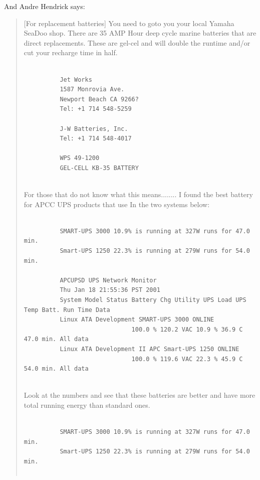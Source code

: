 And Andre Hendrick says:  

\begin{quote}

[For replacement batteries] You need to goto you your local Yamaha SeaDoo
shop. There are 35 AMP Hour deep cycle marine batteries that are direct
replacements. These are gel-cel and will double the runtime and/or cut your
recharge time in half.  

\footnotesize
\begin{verbatim}
          
          Jet Works
          1587 Monrovia Ave.
          Newport Beach CA 9266?
          Tel: +1 714 548-5259
          
          J-W Batteries, Inc.
          Tel: +1 714 548-4017
          
          WPS 49-1200
          GEL-CELL KB-35 BATTERY
     
\end{verbatim}
\normalsize

For those that do not know what this means........ I found the best battery
for APCC UPS products that use In the two systems below:  

\footnotesize
\begin{verbatim}
          
          SMART-UPS 3000 10.9% is running at 327W runs for 47.0 min.
          Smart-UPS 1250 22.3% is running at 279W runs for 54.0 min.
          
          APCUPSD UPS Network Monitor
          Thu Jan 18 21:55:36 PST 2001
          System Model Status Battery Chg Utility UPS Load UPS Temp Batt. Run Time Data
          Linux ATA Development SMART-UPS 3000 ONLINE
                              100.0 % 120.2 VAC 10.9 % 36.9 C 47.0 min. All data
          Linux ATA Development II APC Smart-UPS 1250 ONLINE
                              100.0 % 119.6 VAC 22.3 % 45.9 C 54.0 min. All data
     
\end{verbatim}
\normalsize

Look at the numbers and see that these batteries are better and have more
total running energy than standard ones.  

\footnotesize
\begin{verbatim}
          
          SMART-UPS 3000 10.9% is running at 327W runs for 47.0 min.
          Smart-UPS 1250 22.3% is running at 279W runs for 54.0 min.
          

\end{verbatim}
\end{quote}
